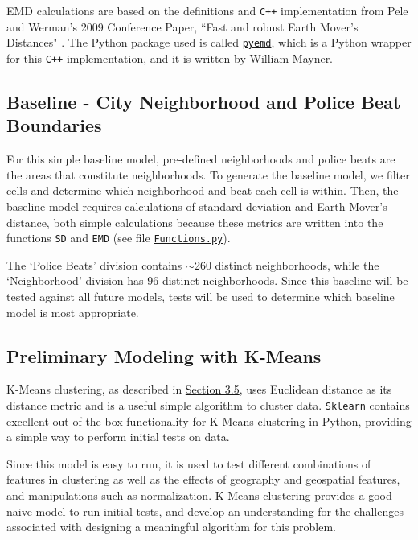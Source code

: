\documentclass[times new roman,12pt]{article}
\begin{document}
EMD calculations are based on the definitions and \texttt{C++} implementation from Pele and Werman's 2009 Conference Paper, ``Fast and robust Earth Mover's Distances" \cite{pele_2009}. The Python package used is called \href{https://github.com/wmayner/pyemd}{\texttt{pyemd}}, which is a Python wrapper for this \texttt{C++} implementation, and it is written by William Mayner.

\subsection{Baseline - City Neighborhood and Police Beat Boundaries}

For this simple baseline model, pre-defined neighborhoods and police beats are the areas that constitute neighborhoods. To generate the baseline model, we filter cells and determine which neighborhood and beat each cell is within. Then, the baseline model requires calculations of standard deviation and Earth Mover's distance, both simple calculations because these metrics are written into the functions \texttt{SD} and \texttt{EMD} (see file \href{https://github.com/jkup11/Geographic-Neighborhood-Clustering/blob/master/Functions.py}{\texttt{Functions.py}}).

The `Police Beats' division contains $\sim$260 distinct neighborhoods, while the `Neighborhood' division has 96 distinct neighborhoods. Since this baseline will be tested against all future models, tests will be used to determine which baseline model is most appropriate.

\subsection{Preliminary Modeling with K-Means}

K-Means clustering, as described in \hyperref[kmeans]{Section 3.5}, uses Euclidean distance as its distance metric and is a useful simple algorithm to cluster data. \texttt{Sklearn} contains excellent out-of-the-box functionality for \href{https://scikit-learn.org/stable/modules/generated/sklearn.cluster.KMeans.html}{K-Means clustering in Python}, providing a simple way to perform initial tests on data.

Since this model is easy to run, it is used to test different combinations of features in clustering as well as the effects of geography and geospatial features, and manipulations such as normalization. K-Means clustering provides a good naive model to run initial tests, and develop an understanding for the challenges associated with designing a meaningful algorithm for this problem. 
\end{document}
